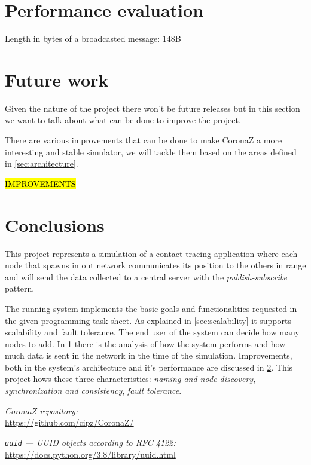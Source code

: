 \documentclass[conference]{IEEEtran}
\begin{document}
\section{Performance evaluation}\label{sec:performance}

	Length in bytes of a broadcasted message: 148B

\section{Future work}\label{sec:future_work}

	Given the nature of the project there won't be future releases but in this section we want to talk about what can be done to improve the project.
	
	There are various improvements that can be done to make CoronaZ a more interesting and stable simulator, we will tackle them based on the areas defined in \ref{sec:architecture}.
	
	\hl{IMPROVEMENTS}
	
\section{Conclusions}\label{sec:conclusions}

	This project represents a simulation of a contact tracing application where each node that spawns in out network communicates its position to the others in range and will send the data collected to a central server with the \textit{publish-subscribe} pattern.
	
	The running system implements the basic goals and functionalities requested in the given programming task sheet.
	As explained in \ref{sec:scalability} it supports scalability and fault tolerance.
	The end user of the system can decide how many nodes to add.
	In \ref{sec:performance} there is the analysis of how the system performs and how much data is sent in the network in the time of the simulation.
	Improvements, both in the system's architecture and it's performance are discussed in \ref{sec:future_work}.
	This project hows these three characteristics: \textit{naming and node discovery}, \textit{synchronization and consistency}, \textit{fault tolerance}.

\begin{thebibliography}{00}
	
		\textit{CoronaZ repository:}\\
		\url{https://github.com/cipz/CoronaZ/}
	
		\textit{\texttt{uuid} — UUID objects according to RFC 4122:}\\
		\url{https://docs.python.org/3.8/library/uuid.html}
		
\end{thebibliography}
\end{document}
